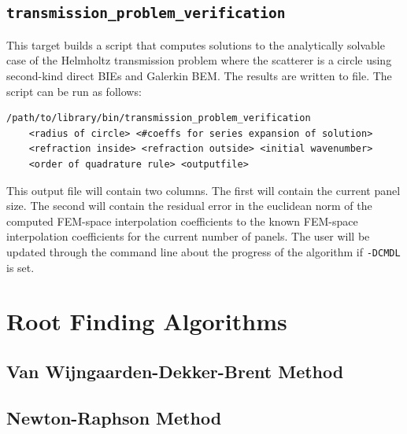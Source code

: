 \documentclass[a4paper, oneside]{thirdparty_stylesheets/discothesis}
\begin{document}
\cprotect\section{\verb|transmission_problem_verification|}
This target builds a script that computes solutions to
the analytically solvable case of the Helmholtz transmission
problem where the scatterer is a circle using second-kind direct
BIEs and Galerkin BEM.
The results are written to file.
The script can be run as follows:
\begin{verbatim}
/path/to/library/bin/transmission_problem_verification 
	<radius of circle> <#coeffs for series expansion of solution> 
	<refraction inside> <refraction outside> <initial wavenumber>
	<order of quadrature rule> <outputfile>
\end{verbatim}
This output file will contain two columns.
The first will contain the current panel size.
The second will contain the residual error in the euclidean norm of the computed FEM-space interpolation coefficients to the known FEM-space interpolation coefficients for the current number of panels.
The user will be updated through the command line about the progress of the algorithm if \verb|-DCMDL| is set.

\chapter{Root Finding Algorithms}
\section{Van Wijngaarden-Dekker-Brent Method}

\section{Newton-Raphson Method}

\end{document}
